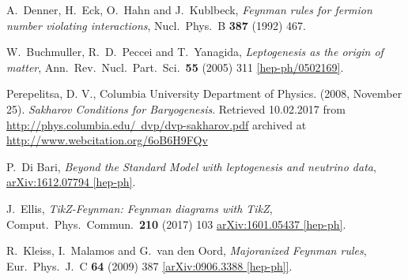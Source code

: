 \begin{thebibliography}{56}
A.~Denner, H.~Eck, O.~Hahn and J.~Kublbeck,
\textit{Feynman rules for fermion number violating interactions},
Nucl.\ Phys.\ B {\textbf{387}} (1992) 467.



W.~Buchmuller, R.~D.~Peccei and T.~Yanagida,
\textit{Leptogenesis as the origin of matter},
Ann.\ Rev.\ Nucl.\ Part.\ Sci.\  {\textbf{55}} (2005) 311
\href{https://arxiv.org/abs/hep-ph/0502169}{[hep-ph/0502169]}.

Perepelitsa, D. V., Columbia University Department of Physics.
(2008, November 25). \textit{Sakharov Conditions for Baryogenesis}.  Retrieved
10.02.2017 from \href{http://phys.columbia.edu/~dvp/dvp-sakharov.pdf}{http://phys.columbia.edu/~dvp/dvp-sakharov.pdf} archived at
 \href{http://www.webcitation.org/6oB6H9FQv}{http://www.webcitation.org/6oB6H9FQv}

P.~Di Bari,
\textit{Beyond the Standard Model with leptogenesis and neutrino data},
\href{https://arxiv.org/abs/1612.07794}{arXiv:1612.07794 [hep-ph]}.

J.~Ellis,
\textit{TikZ-Feynman: Feynman diagrams with TikZ},
Comput.\ Phys.\ Commun.\  {\textbf {210}} (2017) 103
\href{https://arxiv.org/abs/1601.05437}{arXiv:1601.05437 [hep-ph]}.

R.~Kleiss, I.~Malamos and G.~van den Oord,
\textit{Majoranized Feynman rules},
Eur.\ Phys.\ J.\ C {\textbf{64}} (2009) 387
\href{https://arxiv.org/abs/0906.3388v2}{[arXiv:0906.3388 [hep-ph]]}.






\end{thebibliography}
